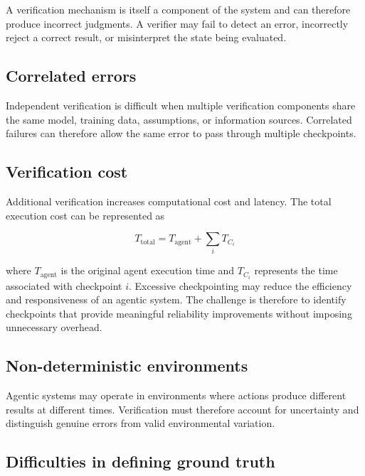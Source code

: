 \documentclass[12pt]{article}
\begin{document}
A verification mechanism is itself a component of the system and can therefore
produce incorrect judgments. A verifier may fail to detect an error, incorrectly
reject a correct result, or misinterpret the state being evaluated.

\subsection{Correlated errors}
\label{sec:correlated-errors}

Independent verification is difficult when multiple verification components
share the same model, training data, assumptions, or information sources.
Correlated failures can therefore allow the same error to pass through multiple
checkpoints.

\subsection{Verification cost}
\label{sec:verification-cost}

Additional verification increases computational cost and latency. The total
execution cost can be represented as

\begin{equation}
T_{\mathrm{total}}
=
T_{\mathrm{agent}}
+
\sum_i T_{C_i}
\label{eq:total-cost}
\end{equation}

where $T_{\mathrm{agent}}$ is the original agent execution time and $T_{C_i}$
represents the time associated with checkpoint $i$. Excessive checkpointing
may reduce the efficiency and responsiveness of an agentic system. The
challenge is therefore to identify checkpoints that provide meaningful
reliability improvements without imposing unnecessary overhead.

\subsection{Non-deterministic environments}
\label{sec:nondeterministic-environments}

Agentic systems may operate in environments where actions produce different
results at different times. Verification must therefore account for uncertainty
and distinguish genuine errors from valid environmental variation.

\subsection{Difficulties in defining ground truth}
\label{sec:ground-truth}
\end{document}
